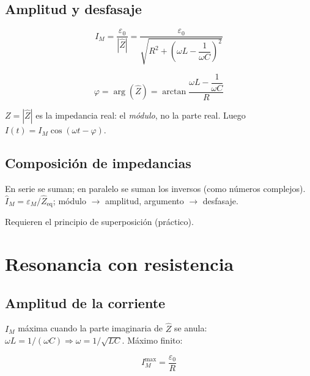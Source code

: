 \documentclass[12pt,a4paper]{article}
\begin{document}


\subsection{Amplitud y desfasaje}

\begin{keybox}
  \[
  \boxed{I_M = \frac{\varepsilon_0}{|\hat Z|}
        = \frac{\varepsilon_0}{\sqrt{R^2 + \left(\omega L -
          \dfrac{1}{\omega C}\right)^2}}}
  \]
\end{keybox}

\begin{keybox}[Desfasaje]
  \[
  \boxed{\varphi = \arg(\hat Z) = \arctan\frac{\omega L - \dfrac{1}{\omega C}}{R}}
  \]
\end{keybox}

$Z = |\hat Z|$ es la impedancia real: el \emph{módulo}, no la parte real.
Luego $I(t) = I_M\cos(\omega t - \varphi)$.

\subsection{Composición de impedancias}

En serie se suman; en paralelo se suman los inversos (como números complejos).
$\hat I_M = \varepsilon_M/\hat Z_{\text{eq}}$; módulo $\to$ amplitud, argumento
$\to$ desfasaje.

\begin{notebox}
  Requieren el principio de superposición (práctico).
\end{notebox}

\section{Resonancia con resistencia}

\subsection{Amplitud de la corriente}

$I_M$ máxima cuando la parte imaginaria de $\hat Z$ se anula: $\omega L =
1/(\omega C) \Rightarrow \omega = 1/\sqrt{LC}$. Máximo finito:

\begin{keybox}
  \[
  \boxed{I_M^{\max} = \frac{\varepsilon_0}{R}}
  \]
\end{keybox}
\end{document}
